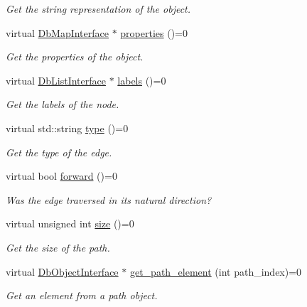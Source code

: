 \begin{DoxyCompactItemize}
\begin{DoxyCompactList}\small\item\em Get the string representation of the object. \end{DoxyCompactList}\item 
virtual \hyperlink{classDbMapInterface}{Db\+Map\+Interface} $\ast$ \hyperlink{classDbObjectInterface_aeede7445ae376fc03af884d5b6f1cb2e}{properties} ()=0
\begin{DoxyCompactList}\small\item\em Get the properties of the object. \end{DoxyCompactList}\item 
virtual \hyperlink{classDbListInterface}{Db\+List\+Interface} $\ast$ \hyperlink{classDbObjectInterface_a281232cca6b9f53f3881100b1a7e5915}{labels} ()=0
\begin{DoxyCompactList}\small\item\em Get the labels of the node. \end{DoxyCompactList}\item 
virtual std\+::string \hyperlink{classDbObjectInterface_a9c2f2de3322439ccdc8e16bd98388040}{type} ()=0
\begin{DoxyCompactList}\small\item\em Get the type of the edge. \end{DoxyCompactList}\item 
virtual bool \hyperlink{classDbObjectInterface_aa3c62699db544791329860136732ddde}{forward} ()=0
\begin{DoxyCompactList}\small\item\em Was the edge traversed in it\textquotesingle{}s natural direction? \end{DoxyCompactList}\item 
virtual unsigned int \hyperlink{classDbObjectInterface_a52f1decaf825e88d3f3e977770af58a0}{size} ()=0
\begin{DoxyCompactList}\small\item\em Get the size of the path. \end{DoxyCompactList}\item 
virtual \hyperlink{classDbObjectInterface}{Db\+Object\+Interface} $\ast$ \hyperlink{classDbObjectInterface_ac6e90274f7a162ffc9c49570ff8f69b6}{get\+\_\+path\+\_\+element} (int path\+\_\+index)=0
\begin{DoxyCompactList}\small\item\em Get an element from a path object. \end{DoxyCompactList}\end{DoxyCompactItemize}



